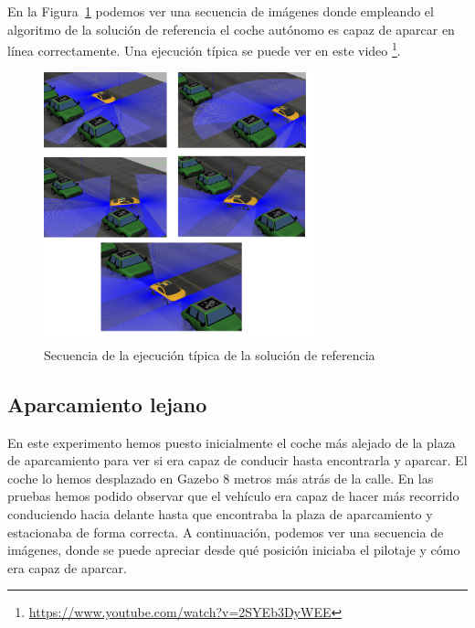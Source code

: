 En la Figura~\ref{fig.AparcamientoSecuencia} podemos ver una secuencia de imágenes donde empleando el algoritmo de la solución de referencia el coche autónomo es capaz de aparcar en línea correctamente. Una ejecución típica se puede ver en este video \footnote{\url{https://www.youtube.com/watch?v=2SYEb3DyWEE}}. 

\begin{figure}[H]
  \begin{center}
    \includegraphics[width=0.7\textwidth]{figures/Autopark/AparcamientoSecuencia.png}
		\caption{Secuencia de la ejecución típica de la solución de referencia}
		\label{fig.AparcamientoSecuencia}
		\end{center}
\end{figure}



\subsection{Aparcamiento lejano}

En este experimento hemos puesto inicialmente el coche más alejado de la plaza de aparcamiento para ver si era capaz de conducir hasta encontrarla y aparcar. El coche lo hemos desplazado en Gazebo 8 metros más atrás de la calle. En las pruebas hemos podido observar que el vehículo era capaz de hacer más recorrido conduciendo hacia delante hasta que encontraba la plaza de aparcamiento y estacionaba de forma correcta. A continuación, podemos ver una secuencia de imágenes, donde se puede apreciar desde qué posición iniciaba el pilotaje y cómo era capaz de aparcar.

